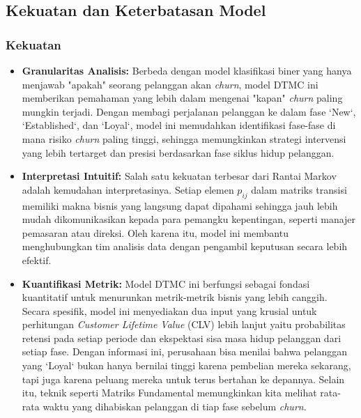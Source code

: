 \documentclass[a4paper,12pt]{article}
\begin{document}
\subsection{Kekuatan dan Keterbatasan Model}
\subsubsection{Kekuatan}
\begin{itemize}
    \item \textbf{Granularitas Analisis:} 
    Berbeda dengan model klasifikasi biner yang hanya menjawab "apakah" seorang pelanggan akan \textit{churn}, model DTMC ini memberikan pemahaman yang lebih dalam mengenai "kapan" \textit{churn} paling mungkin terjadi. Dengan membagi perjalanan pelanggan ke dalam fase `New`, `Established`, dan `Loyal`, model ini memudahkan identifikasi fase-fase di mana risiko \textit{churn} paling tinggi, sehingga memungkinkan strategi intervensi yang lebih tertarget dan presisi berdasarkan fase siklus hidup pelanggan.
    
    \item \textbf{Interpretasi Intuitif:} 
    Salah satu kekuatan terbesar dari Rantai Markov adalah kemudahan interpretasinya. Setiap elemen $p_{ij}$ dalam matriks transisi memiliki makna bisnis yang langsung dapat dipahami sehingga jauh lebih mudah dikomunikasikan kepada para pemangku kepentingan, seperti manajer pemasaran atau direksi. Oleh karena itu, model ini membantu menghubungkan tim analisis data dengan pengambil keputusan secara lebih efektif.
    
    \item \textbf{Kuantifikasi Metrik:} 
    Model DTMC ini berfungsi sebagai fondasi kuantitatif untuk menurunkan metrik-metrik bisnis yang lebih canggih. Secara spesifik, model ini menyediakan dua input yang krusial untuk perhitungan \textit{Customer Lifetime Value} (CLV) lebih lanjut yaitu probabilitas retensi pada setiap periode dan ekspektasi sisa masa hidup pelanggan dari setiap fase. Dengan informasi ini, perusahaan bisa menilai bahwa pelanggan yang `Loyal` bukan hanya bernilai tinggi karena pembelian mereka sekarang, tapi juga karena peluang mereka untuk terus bertahan ke depannya. Selain itu, teknik seperti Matriks Fundamental memungkinkan kita melihat rata-rata waktu yang dihabiskan pelanggan di tiap fase sebelum \textit{churn}.
    
\end{itemize}
  
\end{document}
